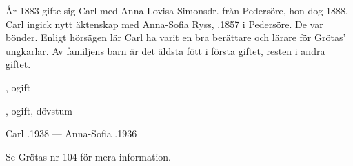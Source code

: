 År 1883 gifte sig Carl med  Anna-Lovisa Simonsdr. från Pedersöre, hon dog 1888. Carl ingick nytt äktenskap med Anna-Sofia Ryss, .1857 i Pedersöre. De var bönder. Enligt hörsägen lär Carl ha varit en bra berättare och lärare för Grötas' ungkarlar. Av familjens barn är det äldsta fött i första giftet, resten i andra giftet.
\begin{jhchildren}
  \item {}, ogift
  \item {}
  \item {}
  \item {}, ogift, dövstum
\end{jhchildren}

Carl .1938  ---  Anna-Sofia .1936


%
Se Grötas nr 104 för mera information.\jhvspace{}



%


